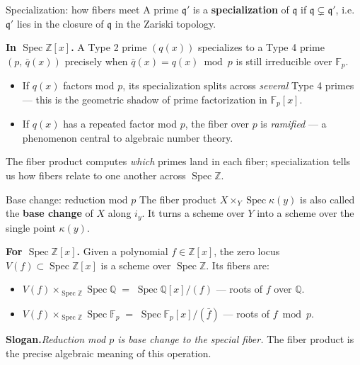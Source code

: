 \documentclass[aspectratio=169,12pt]{beamer}
\begin{document}
\begin{frame}{Specialization: how fibers meet}
  A prime $\mathfrak{q}'$ is a \textbf{specialization} of $\mathfrak{q}$ if
  $\mathfrak{q} \subsetneq \mathfrak{q}'$, i.e.\ $\mathfrak{q}'$ lies
  in the closure of $\mathfrak{q}$ in the Zariski topology.

  \medskip

  \textbf{In $\operatorname{Spec}\mathbb{Z}[x]$.}
  A Type 2 prime $(q(x))$ specializes to a Type 4 prime $(p,\,\bar{q}(x))$
  precisely when $\bar{q}(x) = q(x) \bmod p$ is still irreducible over
  $\mathbb{F}_p$.
  \begin{itemize}
    \item If $q(x)$ factors mod $p$, its specialization splits across
          \emph{several} Type 4 primes — this is the geometric shadow of
          prime factorization in $\mathbb{F}_p[x]$.
    \item If $q(x)$ has a repeated factor mod $p$, the fiber over $p$ is
          \emph{ramified} — a phenomenon central to algebraic number theory.
  \end{itemize}

  \medskip

  The fiber product computes \emph{which} primes land in each fiber;
  specialization tells us how fibers relate to one another across $\operatorname{Spec}\mathbb{Z}$.
\end{frame}

\begin{frame}{Base change: reduction mod $p$}
  The fiber product $X \times_Y \operatorname{Spec}\kappa(y)$
  is also called the \textbf{base change} of $X$ along $i_y$.
  It turns a scheme over $Y$ into a scheme over the single point $\kappa(y)$.

  \medskip

  \textbf{For $\operatorname{Spec}\mathbb{Z}[x]$.}\enspace
  Given a polynomial $f \in \mathbb{Z}[x]$, the zero locus
  $V(f) \subset \operatorname{Spec}\mathbb{Z}[x]$ is a scheme over
  $\operatorname{Spec}\mathbb{Z}$.
  Its fibers are:
  \begin{itemize}
    \item $V(f) \times_{\operatorname{Spec}\mathbb{Z}} \operatorname{Spec}\mathbb{Q}
          \;=\; \operatorname{Spec}\mathbb{Q}[x]/(f)$
          \quad — roots of $f$ over $\mathbb{Q}$.
    \item $V(f) \times_{\operatorname{Spec}\mathbb{Z}} \operatorname{Spec}\mathbb{F}_p
          \;=\; \operatorname{Spec}\mathbb{F}_p[x]/(\bar{f})$
          \quad — roots of $f \bmod p$.
  \end{itemize}

  \medskip

  \textbf{Slogan.}\enspace \emph{Reduction mod $p$ is base change to the
  special fiber.}
  The fiber product is the precise algebraic meaning of this operation.
\end{frame}
\end{document}
